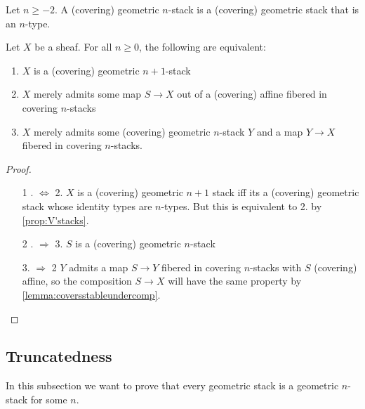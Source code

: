 \begin{definition}
	Let $n \ge -2$. A (covering) geometric $n$-stack is a (covering) geometric stack that is an $n$-type.
\end{definition}
\begin{prop}
	Let $X$ be a sheaf. For all $n \ge 0$, the following are equivalent:
	\begin{enumerate}
		\item $X$ is a (covering) geometric $n+1$-stack
		\item $X$ merely admits some map $S \to X$ out of a (covering) affine fibered in covering $n$-stacks
		\item $X$ merely admits some (covering) geometric $n$-stack $Y$ and a map $Y \to X$ fibered in covering $n$-stacks.
	\end{enumerate}
\end{prop}
\begin{proof}
	\
	\begin{enumerate}
		\item[1 . $\Leftrightarrow$ 2.]
		$X$ is a (covering) geometric $n+1$ stack iff its a (covering) geometric stack whose identity types are $n$-types. But this is equivalent to 2. by \ref{prop:V'stacks}.
		\item[2 . $\Rightarrow$ 3.]
		$S$ is a (covering) geometric $n$-stack
		\item [3. $\Rightarrow$ 2]
		$Y$ admits a map $S \to Y$  fibered in covering $n$-stacks with $S$ (covering) affine, so the composition $S \to X$ will have the same property by \ref{lemma:coversstableundercomp}.
	\end{enumerate}
\end{proof}
\subsection{Truncatedness}
In this subsection we want to prove that every geometric stack is a geometric $n$-stack for some $n$.

